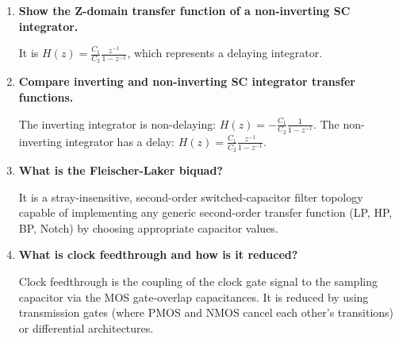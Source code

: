 \documentclass[12pt,a4paper]{article}
\newcommand{\Q}[1]{\textbf{#1}\par\noindent\ignorespaces}
\begin{document}
\begin{tcolorbox}[exambox, title={\textbf{Frequently Asked / Viva Questions}}]
\begin{enumerate}[topsep=0pt, label=\textbf{Q\arabic*.}, itemsep=5pt]
  \item \Q{Show the Z-domain transfer function of a non-inverting SC integrator.}
    It is $H(z) = \frac{C_1}{C_2} \frac{z^{-1}}{1 - z^{-1}}$, which represents a delaying integrator.
  \item \Q{Compare inverting and non-inverting SC integrator transfer functions.}
    The inverting integrator is non-delaying: $H(z) = -\frac{C_1}{C_2} \frac{1}{1-z^{-1}}$. The non-inverting integrator has a delay: $H(z) = \frac{C_1}{C_2} \frac{z^{-1}}{1-z^{-1}}$.
  \item \Q{What is the Fleischer-Laker biquad?}
    It is a stray-insensitive, second-order switched-capacitor filter topology capable of implementing any generic second-order transfer function (LP, HP, BP, Notch) by choosing appropriate capacitor values.
  \item \Q{What is clock feedthrough and how is it reduced?}
    Clock feedthrough is the coupling of the clock gate signal to the sampling capacitor via the MOS gate-overlap capacitances. It is reduced by using transmission gates (where PMOS and NMOS cancel each other's transitions) or differential architectures.
\end{enumerate}
\end{tcolorbox}
\end{document}
